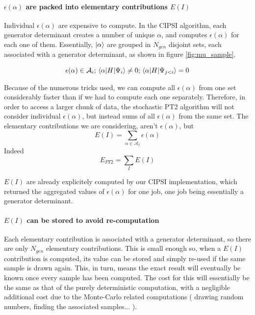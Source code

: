 \documentclass[./thesis.tex]{subfiles}
\begin{document}
\paragraph{$\epsilon(\alpha)$ are packed into elementary contributions $E(I)$}
Individual $\epsilon(\alpha)$ are expensive to compute. In the CIPSI algorithm, each generator determinant creates a number of unique $\alpha$, and computes $\epsilon(\alpha)$ for each one of them.
Essentially, $\ket \alpha$ are grouped in $N_{gen}$ disjoint sets, each associated with a generator determinant, as shown in figure \ref{fig:mu_sample}.

	$$\epsilon(\alpha) \in \mathcal{A}_i ; \mel{\alpha}{H}{\Psi_i} \neq 0 ; \mel{\alpha}{H}{\Psi_{j<i}} =0 $$

Because of the numerous tricks used, we can compute all $\epsilon(\alpha)$ from one set considerably faster than if we had to compute each one separately. Therefore, in order to access a larger chunk of data, the stochastic PT2 algorithm will not consider individual $\epsilon(\alpha)$, but instead sums of all $\epsilon(\alpha)$ from the same set.
The elementary contributions we are considering, aren't $\epsilon(\alpha)$, but
	$$E(I) = \sum_{\alpha \in \mathcal{A}_I} \epsilon(\alpha)$$
Indeed
    $$E_{PT2} = \sum_{I} E(I)$$
    
$E(I)$ are already explicitely computed by our CIPSI implementation, which returned the aggregated values of $\epsilon(\alpha)$ for one job, one job being essentially a generator determinant.

\paragraph{$E(I)$ can be stored to avoid re-computation}
Each elementary contribution is associated with a generator determinant, so there are only $N_{gen}$ elementary contributions. This is small enough so, when a $E(I)$ contribution is computed, its value can be stored and simply re-used if the same sample is drawn again. This, in turn, means the exact result will eventually be known once every sample has been computed. The cost for this will essentially be the same as that of the purely deterministic computation, with a negligible additional cost due to the Monte-Carlo related computations ( drawing random numbers, finding the associated samples... ).
\end{document}
